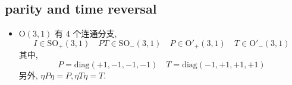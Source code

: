 \subsection{parity and time reversal}
\begin{itemize}
	\item $\mathrm{O}(3, 1)$ 有 4 个连通分支,
	\begin{equation}
		I \in \mathrm{SO}_+(3, 1) \quad P T \in \mathrm{SO}_-(3, 1) \quad P \in \mathrm{O}'_+(3, 1) \quad T \in \mathrm{O}'_-(3, 1)
	\end{equation}
	其中,
	\begin{equation}
		P = \mathrm{diag}(+ 1, - 1, - 1, - 1) \quad T = \mathrm{diag}(- 1, + 1, + 1, + 1)
	\end{equation}
	另外, $\eta P \eta = P, \eta T \eta = T$.
\end{itemize}

